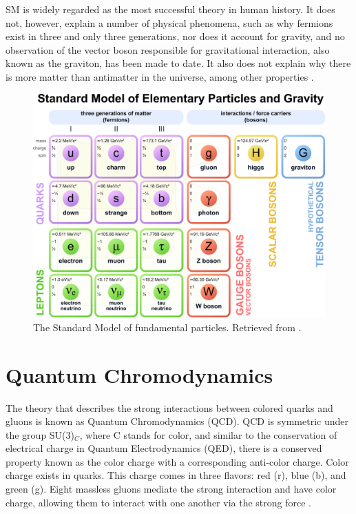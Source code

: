 SM is widely regarded as the most successful theory in human history. It does not, however, explain a number of physical phenomena, such as why fermions exist in three and only three generations, nor does it account for gravity, and no observation of the vector boson responsible for gravitational interaction, also known as the graviton, has been made to date. It also does not explain why there is more matter than antimatter in the universe, among other properties \cite{grummer2021search, danilov2020measurement}.
\begin{figure}[htp!]
	\centering
	\includegraphics[scale=0.34]{MainContent/Figs/SM.eps}
	\caption{The Standard Model of fundamental particles. Retrieved from \cite{danilov2020measurement}.}
	\label{fig:sm}
\end{figure}

\section{Quantum Chromodynamics}
The theory that describes the strong interactions between colored quarks and gluons is known as Quantum Chromodynamics (QCD). QCD is symmetric under the group SU(3)$_C$, where C stands for color, and similar to the conservation of electrical charge in Quantum Electrodynamics (QED), there is a conserved property known as the color charge with a corresponding anti-color charge. Color charge exists in quarks. This charge comes in three flavors: red (r), blue (b), and green (g). Eight massless gluons mediate the strong interaction and have color charge, allowing them to interact with one another via the strong force \cite{stiller2016full, di2020measurement, thomson2013modern}.

